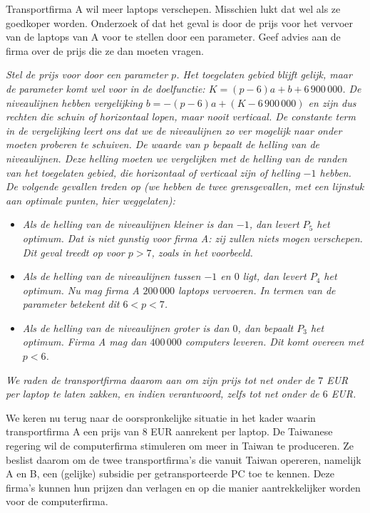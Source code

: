     \begin{werktekstoef}    
    
    \item Transportfirma A wil meer laptops verschepen. Misschien lukt dat wel als ze goedkoper worden. Onderzoek of dat het geval is door de prijs voor het vervoer van de laptops van A voor te stellen door een parameter. Geef advies aan de firma over de prijs die ze dan moeten vragen.
    
    \emph{Stel de prijs voor door een parameter $p$. Het toegelaten gebied blijft gelijk, maar de parameter komt wel voor in de doelfunctie: $K=(p-6)a+b+6\,900\,000$. De niveaulijnen hebben vergelijking $b=-(p-6)a+(K-6\,900\,000)$ en zijn dus rechten die schuin of horizontaal lopen, maar nooit verticaal. De constante term in de vergelijking leert ons dat we de niveaulijnen zo ver mogelijk naar onder moeten proberen te schuiven. De waarde van $p$ bepaalt de helling van de niveaulijnen. Deze helling moeten we vergelijken met de helling van de randen van het toegelaten gebied, die horizontaal of verticaal zijn of helling $-1$ hebben. De volgende gevallen treden op (we hebben de twee grensgevallen, met een lijnstuk aan optimale punten, hier weggelaten):}

    \begin{itemize}
        \item \emph{Als de helling van de niveaulijnen kleiner is dan $-1$, dan levert $P_5$ het optimum. Dat is niet gunstig voor firma A: zij zullen niets mogen verschepen. Dit geval treedt op voor $p>7$, zoals in het voorbeeld.}
        \item \emph{Als de helling van de niveaulijnen tussen $-1$ en $0$ ligt, dan levert $P_4$ het optimum. Nu mag firma A $200\,000$ laptops vervoeren. In termen van de parameter betekent dit $6<p<7$.}
        \item \emph{Als de helling van de niveaulijnen groter is dan $0$, dan bepaalt $P_3$ het optimum. Firma A mag dan $400\,000$ computers leveren. Dit komt overeen met $p<6$.}
    \end{itemize}
        
    \emph{We raden de transportfirma daarom aan om zijn prijs tot net onder de $7$ EUR per laptop te laten zakken, en indien verantwoord, zelfs tot net onder de $6$ EUR.}
    \end{werktekstoef}
    
We keren nu terug naar de oorspronkelijke situatie in het kader waarin transportfirma A een prijs van $8$ EUR aanrekent per laptop. De Taiwanese regering wil de computerfirma stimuleren om meer in Taiwan te produceren. Ze beslist daarom om de twee transportfirma’s die vanuit Taiwan opereren, namelijk A en B, een (gelijke) subsidie per getransporteerde PC toe te kennen. Deze firma's kunnen hun prijzen dan verlagen en op die manier aantrekkelijker worden voor de computerfirma.
    
